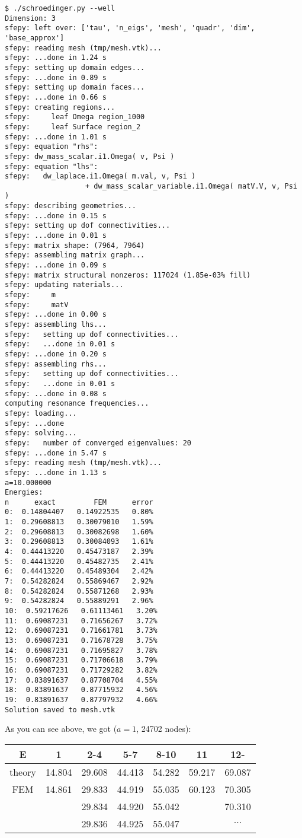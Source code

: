 \begin{lstlisting}
$ ./schroedinger.py --well
Dimension: 3
sfepy: left over: ['tau', 'n_eigs', 'mesh', 'quadr', 'dim', 'base_approx']
sfepy: reading mesh (tmp/mesh.vtk)...
sfepy: ...done in 1.24 s
sfepy: setting up domain edges...
sfepy: ...done in 0.89 s
sfepy: setting up domain faces...
sfepy: ...done in 0.66 s
sfepy: creating regions...
sfepy:     leaf Omega region_1000
sfepy:     leaf Surface region_2
sfepy: ...done in 1.01 s
sfepy: equation "rhs":
sfepy: dw_mass_scalar.i1.Omega( v, Psi )
sfepy: equation "lhs":
sfepy:   dw_laplace.i1.Omega( m.val, v, Psi )
                   + dw_mass_scalar_variable.i1.Omega( matV.V, v, Psi )
sfepy: describing geometries...
sfepy: ...done in 0.15 s
sfepy: setting up dof connectivities...
sfepy: ...done in 0.01 s
sfepy: matrix shape: (7964, 7964)
sfepy: assembling matrix graph...
sfepy: ...done in 0.09 s
sfepy: matrix structural nonzeros: 117024 (1.85e-03% fill)
sfepy: updating materials...
sfepy:     m
sfepy:     matV
sfepy: ...done in 0.00 s
sfepy: assembling lhs...
sfepy:   setting up dof connectivities...
sfepy:   ...done in 0.01 s
sfepy: ...done in 0.20 s
sfepy: assembling rhs...
sfepy:   setting up dof connectivities...
sfepy:   ...done in 0.01 s
sfepy: ...done in 0.08 s
computing resonance frequencies...
sfepy: loading...
sfepy: ...done
sfepy: solving...
sfepy:   number of converged eigenvalues: 20
sfepy: ...done in 5.47 s
sfepy: reading mesh (tmp/mesh.vtk)...
sfepy: ...done in 1.13 s
a=10.000000
Energies:
n      exact         FEM      error
0:  0.14804407   0.14922535   0.80%
1:  0.29608813   0.30079010   1.59%
2:  0.29608813   0.30082698   1.60%
3:  0.29608813   0.30084093   1.61%
4:  0.44413220   0.45473187   2.39%
5:  0.44413220   0.45482735   2.41%
6:  0.44413220   0.45489304   2.42%
7:  0.54282824   0.55869467   2.92%
8:  0.54282824   0.55871268   2.93%
9:  0.54282824   0.55889291   2.96%
10:  0.59217626   0.61113461   3.20%
11:  0.69087231   0.71656267   3.72%
12:  0.69087231   0.71661781   3.73%
13:  0.69087231   0.71678728   3.75%
14:  0.69087231   0.71695827   3.78%
15:  0.69087231   0.71706618   3.79%
16:  0.69087231   0.71729282   3.82%
17:  0.83891637   0.87708704   4.55%
18:  0.83891637   0.87715932   4.56%
19:  0.83891637   0.87797932   4.66%
Solution saved to mesh.vtk
\end{lstlisting}

As you can see above, we got ($a=1$, 24702 nodes):

\begin{tabular}{ c | c c c c c c }
E      & 1 & 2-4 & 5-7 & 8-10 & 11 & 12- \\
\hline
theory & 14.804 & 29.608 & 44.413 & 54.282 & 59.217 & 69.087 \\
FEM    & 14.861 & 29.833 & 44.919 & 55.035 & 60.123 & 70.305 \\
       &        & 29.834 & 44.920 & 55.042 &        & 70.310 \\
       &        & 29.836 & 44.925 & 55.047 &        & $\cdots$ \\
\end{tabular}

